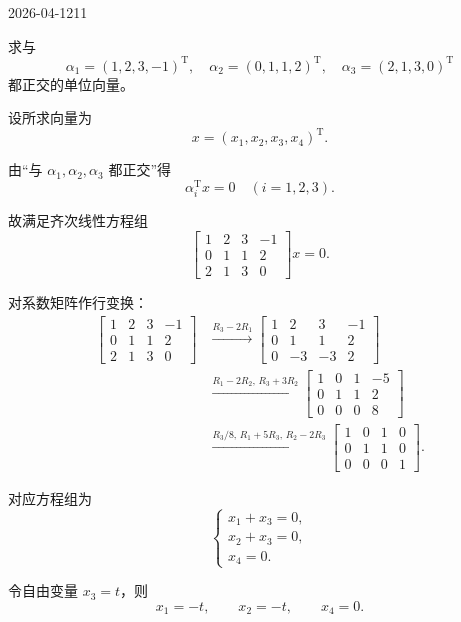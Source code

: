 \begin{mistake}{2026-04-12}{11}

\begin{problemcontent}
求与
\[
\alpha_1=(1,2,3,-1)^{\mathrm T},\quad
\alpha_2=(0,1,1,2)^{\mathrm T},\quad
\alpha_3=(2,1,3,0)^{\mathrm T}
\]
都正交的单位向量。

\end{problemcontent}

\begin{solutioncontent}
设所求向量为
\[
x=(x_1,x_2,x_3,x_4)^{\mathrm T}.
\]

由“与 \(\alpha_1,\alpha_2,\alpha_3\) 都正交”得
\[
\alpha_i^{\mathrm T}x=0\quad (i=1,2,3).
\]

故满足齐次线性方程组
\[
\begin{bmatrix}
1&2&3&-1\\
0&1&1&2\\
2&1&3&0
\end{bmatrix}
x=0.
\]

对系数矩阵作行变换：
\[
\begin{aligned}
\begin{bmatrix}
1&2&3&-1\\
0&1&1&2\\
2&1&3&0
\end{bmatrix}
&\xrightarrow{R_3-2R_1}
\begin{bmatrix}
1&2&3&-1\\
0&1&1&2\\
0&-3&-3&2
\end{bmatrix}\\
&\xrightarrow{R_1-2R_2,\,R_3+3R_2}
\begin{bmatrix}
1&0&1&-5\\
0&1&1&2\\
0&0&0&8
\end{bmatrix}\\
&\xrightarrow{R_3/8,\,R_1+5R_3,\,R_2-2R_3}
\begin{bmatrix}
1&0&1&0\\
0&1&1&0\\
0&0&0&1
\end{bmatrix}.
\end{aligned}
\]

对应方程组为
\[
\begin{cases}
x_1+x_3=0,\\
x_2+x_3=0,\\
x_4=0.
\end{cases}
\]

令自由变量 \(x_3=t\)，则
\[
x_1=-t,\qquad x_2=-t,\qquad x_4=0.
\]


\end{solutioncontent}
\end{mistake}
